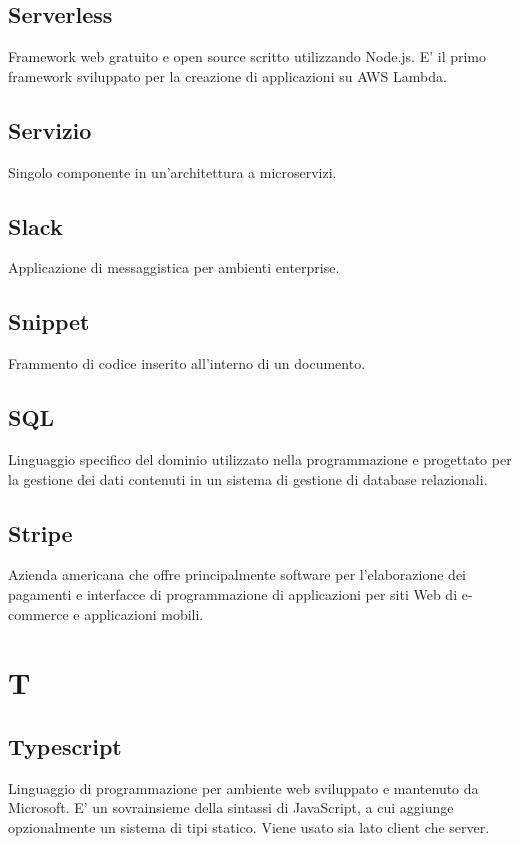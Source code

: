 \subsection*{Serverless}
Framework web gratuito e open source scritto utilizzando Node.js. E' il primo framework sviluppato per la creazione di applicazioni su AWS Lambda.

\subsection*{Servizio}
Singolo componente in un'architettura a microservizi.

\subsection*{Slack}
Applicazione di messaggistica per ambienti enterprise.

\subsection*{Snippet}
Frammento di codice inserito all'interno di un documento.

\subsection*{SQL}
Linguaggio specifico del dominio utilizzato nella programmazione e progettato per la gestione dei dati contenuti in un sistema di gestione di database relazionali.

\subsection*{Stripe}
Azienda americana che offre principalmente software per l'elaborazione dei pagamenti e interfacce di programmazione di applicazioni per siti Web di e-commerce e applicazioni mobili.

\section*{T}
\subsection*{Typescript}
Linguaggio di programmazione per ambiente web sviluppato e mantenuto da Microsoft. E' un sovrainsieme della sintassi di JavaScript, a cui aggiunge opzionalmente un sistema di tipi statico. Viene usato sia lato client che server.

